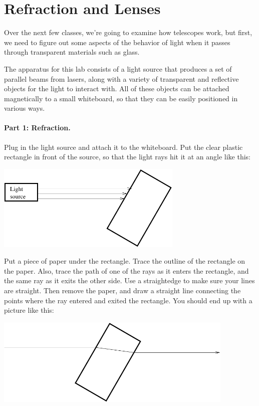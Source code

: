 \section{Refraction and Lenses}

\makelabheader 

\bigskip

Over the next few classes, we're going to examine how telescopes work,
but first, we need to figure out some aspects of the behavior of light
when it passes through transparent materials such as glass.

The apparatus for this lab consists of a light source that produces a set
of parallel beams from lasers, along with a variety of transparent and
reflective objects for the light to interact with.  All of these objects
can be attached magnetically to a small whiteboard, so that they can be
easily positioned in various ways.

\paragraph{Part 1: Refraction.}
Plug in the light source and attach it to the whiteboard.  Put
the clear plastic rectangle in front of the source, so that
the light rays hit it at an angle like this:

\bigskip
\centerline{\includegraphics[width=3.5in]{lenses1/lensfig1.pdf}}
\bigskip

Put a piece of paper under the rectangle.  Trace the outline of the rectangle
on the paper.  Also, trace the path of one of the rays as it enters
the rectangle, and the same ray as it exits the other side.  Use
a straightedge to make sure your lines are straight.
Then remove the paper, and draw a straight line connecting the points
where the ray entered and exited the rectangle. 
You should end up
with a picture like this:

\bigskip
\centerline{\includegraphics[width=4.5in]{lenses1/lensfig2.pdf}}
\bigskip

